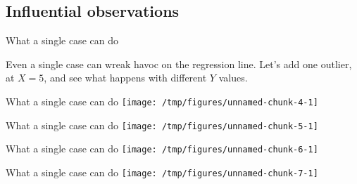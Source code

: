 \documentclass{beamer}\usepackage[]{graphicx}\usepackage[]{color}
\makeatletter
\def\maxwidth{ %
  \ifdim\Gin@nat@width>\linewidth
    \linewidth
  \else
    \Gin@nat@width
  \fi
}
\newenvironment{knitrout}{}{} %
\makeatother
\begin{document}
\begin{darkframes}
    \section{Influential observations}
    
    \begin{frame}{What a single case can do}
      \begin{center}
        Even a single case can wreak havoc on the regression line.
        Let's add one outlier, at $X=5$, and see what happens with different
        $Y$ values.
      \end{center}
    \end{frame}

    \begin{frame}{What a single case can do}
\begin{knitrout}
\color{fgcolor}
\texttt{[image: /tmp/figures/unnamed-chunk-4-1]} 

\end{knitrout}
    \end{frame}

    \begin{frame}{What a single case can do}
\begin{knitrout}
\color{fgcolor}
\texttt{[image: /tmp/figures/unnamed-chunk-5-1]} 

\end{knitrout}
    \end{frame}

    \begin{frame}{What a single case can do}
\begin{knitrout}
\color{fgcolor}
\texttt{[image: /tmp/figures/unnamed-chunk-6-1]} 

\end{knitrout}
    \end{frame}

    \begin{frame}{What a single case can do}
\begin{knitrout}
\color{fgcolor}
\texttt{[image: /tmp/figures/unnamed-chunk-7-1]} 

\end{knitrout}
    \end{frame}

    \begin{frame}
    \end{frame}


\end{darkframes}
\end{document}
